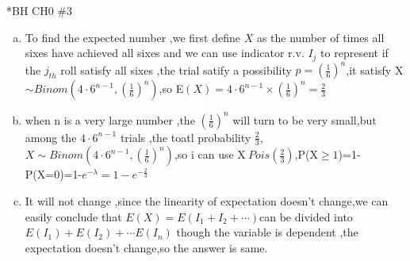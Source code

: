 \documentclass{article}
\begin{document}
\begin{homeworkProblem}*{BH CH0 \#3}
	\begin{enumerate}[(a)]
		\item To find the expected number ,we first define $X$ as the number of times all sixes have achieved all sixes and we can use indicator r.v. $I_j$ to represent if the $j_{th}$ roll satisfy all sixes ,the trial satify a possibility $p=(\frac{1}{6})^n$,it satisfy X$\sim Binom(4\cdot 6^{n-1},(\frac{1}{6})^n)$,so E$(X)=4\cdot 6^{n-1}\times (\frac{1}{6})^n=\frac{2}{3}$
		\item when n is a very large number ,the $(\frac{1}{6})^n$ will turn to be very small,but among the $4\cdot 6^{n-1}$ trials ,the  toatl probability $\frac{2}{3}$,$X\sim Binom(4\cdot 6^{n-1},(\frac{1}{6})^n)$,so i can use X$~Pois(\frac{2}{3})$,P(X$\geq 1$)=1-P(X=0)=1-$e^{-\lambda}=1-e^{-\frac{2}{3}}$
\item It will not change ,since the linearity of expectation doesn't change,we can easily conclude that $E(X)=E(I_1+I_2+\cdots)$can be divided into $E(I_1)+E(I_2)+\cdots E(I_n)$ though the variable is dependent ,the expectation doesn't change,so the answer is same.

	\end{enumerate}
	
\end{homeworkProblem}
\end{document}

